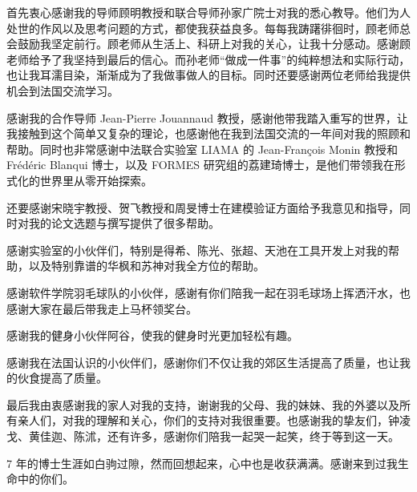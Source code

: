 \begin{acknowledgement}

首先衷心感谢我的导师顾明教授和联合导师孙家广院士对我的悉心教导。他们为人处世的作风以及思考问题的方式，都使我获益良多。每每我踌躇徘徊时，顾老师总会鼓励我坚定前行。顾老师从生活上、科研上对我的关心，让我十分感动。感谢顾老师给予了我坚持到最后的信心。而孙老师“做成一件事”的纯粹想法和实际行动，也让我耳濡目染，渐渐成为了我做事做人的目标。同时还要感谢两位老师给我提供机会到法国交流学习。

感谢我的合作导师 Jean-Pierre Jouannaud 教授，感谢他带我踏入重写的世界，让我接触到这个简单又复杂的理论，也感谢他在我到法国交流的一年间对我的照顾和帮助。同时也非常感谢中法联合实验室 LIAMA 的 Jean-Fran\c{c}ois Monin 教授和 Fr\'ed\'eric Blanqui 博士，以及 FORMES 研究组的荔建琦博士，是他们带领我在形式化的世界里从零开始探索。

还要感谢宋晓宇教授、贺飞教授和周旻博士在建模验证方面给予我意见和指导，同时对我的论文选题与撰写提供了很多帮助。

感谢实验室的小伙伴们，特别是得希、陈光、张超、天池在工具开发上对我的帮助，以及特别靠谱的华枫和苏神对我全方位的帮助。

感谢软件学院羽毛球队的小伙伴，感谢有你们陪我一起在羽毛球场上挥洒汗水，也感谢大家在最后带我走上马杯领奖台。

感谢我的健身小伙伴阿谷，使我的健身时光更加轻松有趣。

感谢我在法国认识的小伙伴们，感谢你们不仅让我的郊区生活提高了质量，也让我的伙食提高了质量。

最后我由衷感谢我的家人对我的支持，谢谢我的父母、我的妹妹、我的外婆以及所有亲人们，对我的理解和关心，你们的支持对我很重要。也感谢我的挚友们，钟凌戈、黄佳迦、陈沭，还有许多，感谢你们陪我一起哭一起笑，终于等到这一天。

7 年的博士生涯如白驹过隙，然而回想起来，心中也是收获满满。感谢来到过我生命中的你们。

\end{acknowledgement}
